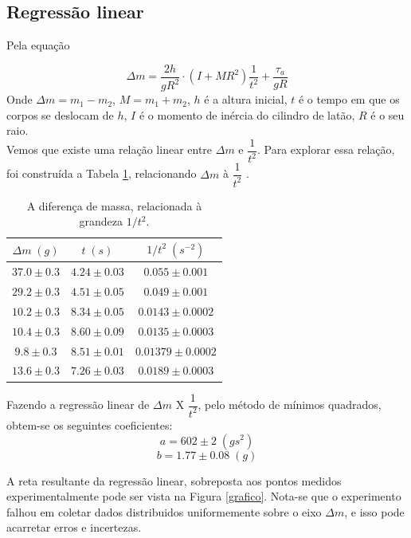 \documentclass[12pt,a4paper]{article}
\begin{document}
\subsection{Regressão linear}
Pela equação 

$$\Delta m = \frac{2h}{gR^2} \cdot (I + MR^2)\dfrac{1}{t^2}  + \frac{\tau _a} {gR}$$
Onde $\Delta m = m_1 - m_2$, $ M = m_1 + m_2 $, $h$ é a altura inicial, $t$ é o tempo em que os corpos se deslocam de $h$, $I$ é o momento de inércia do cilindro de latão, $R$ é o seu raio.\\
Vemos que existe uma relação linear entre $\Delta m$ e $ \dfrac{1}{t^2}$. Para explorar essa relação, foi construída a Tabela \ref{linear}, relacionando $\Delta m$ à $ \dfrac{1}{t^2} $ .

\begin{table}[!htbp]
\centering
\def\arraystretch{1.5}
\caption{A diferença de massa, relacionada à grandeza $1/t^2$.}
\begin{tabular}{|c|c|c|}
\hline 
$\Delta m \; (g)$ & $t \; (s)$ & $1/t^2 \; (s^{-2})$ \\ 
\hline 
$37.0 \pm 0.3$ & $4.24 \pm 0.03 $ & $0.055 \pm 0.001 $  \\
\hline
$29.2 \pm 0.3$ & $4.51 \pm 0.05 $ & $0.049 \pm 0.001$ \\
\hline
$10.2 \pm 0.3$ & $8.34 \pm 0.05 $ & $0.0143 \pm 0.0002$\\
\hline
$10.4 \pm 0.3$ & $8.60 \pm 0.09 $ & $ 0.0135 \pm 0.0003 $\\
\hline
$9.8 \pm 0.3$ & $8.51 \pm 0.01 $ & $ 0.01379 \pm 0.0002 $\\
\hline
$13.6 \pm 0.3$ & $7.26 \pm 0.03 $ & $ 0.0189 \pm 0.0003 $ \\
\hline
\end{tabular} 
\label{linear}
\end{table}
Fazendo a regressão linear de $ \Delta m$ X $ \dfrac{1}{t^2} $, pelo método de mínimos quadrados, obtem-se os seguintes coeficientes: 
	$$ a = 602 \pm 2 \; (gs^2)$$
	$$ b = 1.77 \pm 0.08 \; (g) $$

A reta resultante da regressão linear, sobreposta aos pontos medidos experimentalmente pode ser vista na Figura \ref{grafico}. Nota-se que o experimento falhou em coletar dados distribuidos uniformemente sobre o eixo $ \Delta m$, e isso pode acarretar erros e incertezas.
\end{document}
